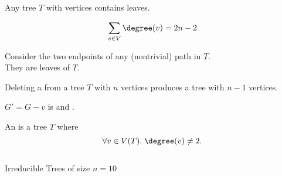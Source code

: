 \begin{frame}{}
  \begin{lemma}
    Any tree $T$ with  vertices contains  leaves.
  \end{lemma}

  \pause
  \vspace{0.30cm}
  \[
    \sum_{v \in V} \degree(v) = 2n - 2
  \]

  \pause
  \vspace{0.50cm}
  \begin{center}
    Consider the two endpoints of any  (nontrivial) path in $T$.
    \pause \\[5pt]
    They are leaves of $T$.
  \end{center}
\end{frame}

\begin{frame}{}
  \begin{lemma}
    Deleting a  from a tree $T$ with $n$ vertices
    produces a tree with $n-1$ vertices.
  \end{lemma}

  \pause
  \vspace{0.30cm}
  \begin{center}

    \vspace{0.20cm}
    $G' = G - v$ is  and .

    \pause
    \vspace{0.50cm}
  \end{center}
\end{frame}

\begin{frame}{}
  \begin{definition}
    An  is a tree $T$ where
    \[
      \forall v \in V(T).\; \degree(v) \neq 2.
    \]
  \end{definition}

  \pause
  \vspace{0.30cm}
  \begin{columns}
      \pause
  \end{columns}

  \pause
  \vspace{0.30cm}
  \begin{center}
     Irreducible Trees of size $n = 10$
  \end{center}
\end{frame}

